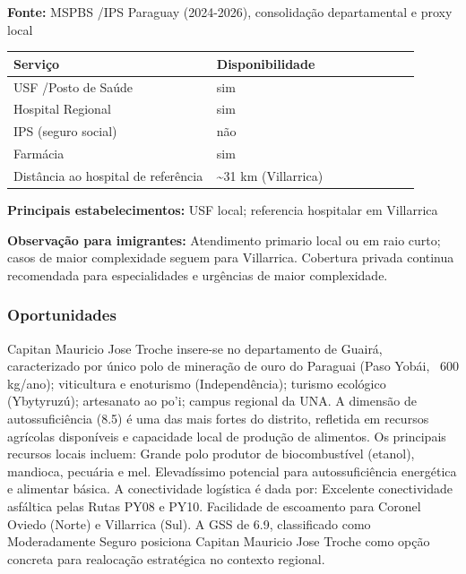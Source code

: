 \textbf{Fonte:} MSPBS /\allowbreak  IPS Paraguay (2024-2026), consolidação
departamental e proxy local

{\def\LTcaptype{none} %
\begin{longtable}{@{}>{\raggedright\arraybackslash}p{0.45\linewidth} >{\raggedright\arraybackslash}p{0.45\linewidth}@{}}
\toprule\noalign{}
Serviço & Disponibilidade \\
\midrule\noalign{}
\endhead
\bottomrule\noalign{}
\endlastfoot
USF /\allowbreak  Posto de Saúde & sim \\
Hospital Regional & sim \\
IPS (seguro social) & não \\
Farmácia & sim \\
Distância ao hospital de referência & \textasciitilde31 km
(Villarrica) \\
\end{longtable}
}

\textbf{Principais estabelecimentos:} USF local; referencia hospitalar
em Villarrica

\textbf{Observação para imigrantes:} Atendimento primario local ou em
raio curto; casos de maior complexidade seguem para Villarrica.
Cobertura privada continua recomendada para especialidades e urgências
de maior complexidade.
\newpage

\subsubsection*{Oportunidades}\label{oport-capitan-mauricio-jose-troche-0403}
Capitan Mauricio Jose Troche insere-se no departamento de Guairá, caracterizado por único polo de mineração de ouro do Paraguai (Paso Yobái, ~600 kg/ano); viticultura e enoturismo (Independência); turismo ecológico (Ybytyruzú); artesanato ao po'i; campus regional da UNA. A dimensão de autossuficiência (8.5) é uma das mais fortes do distrito, refletida em recursos agrícolas disponíveis e capacidade local de produção de alimentos. Os principais recursos locais incluem: Grande polo produtor de biocombustível (etanol), mandioca, pecuária e mel. Elevadíssimo potencial para autossuficiência energética e alimentar básica. A conectividade logística é dada por: Excelente conectividade asfáltica pelas Rutas PY08 e PY10. Facilidade de escoamento para Coronel Oviedo (Norte) e Villarrica (Sul). A GSS de 6.9, classificado como Moderadamente Seguro posiciona Capitan Mauricio Jose Troche como opção concreta para realocação estratégica no contexto regional.

